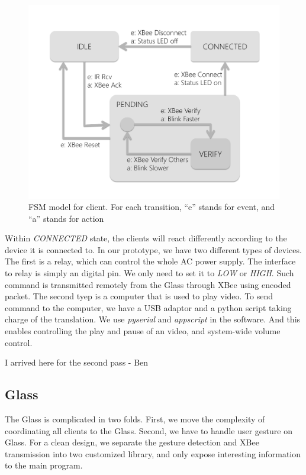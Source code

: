 \begin{figure}
  \centering
  \includegraphics[width=\linewidth]{../figs/clientFSM.pdf}
  \caption{FSM model for client. For each transition, ``e'' stands for event, and ``a'' stands for action}
  \label{fig:clientFSM}
\end{figure}

Within {\it CONNECTED} state, the clients will react differently according to the device it is connected to. In our prototype, we have two different types of devices. The first is a relay, which can control the whole AC power supply. The interface to relay is simply an digital pin. We only need to set it to {\it LOW} or {\it HIGH}. Such command is transmitted remotely from the Glass through XBee using encoded packet. The second tyep is a computer that is used to play video. To send command to the computer, we have a USB adaptor and a python script taking charge of the translation. We use {\it pyserial} and {\it appscript} in the software. And this enables controlling the play and pause of an video, and system-wide volume control.

{\color{red} I arrived here for the second pass - Ben}

\subsection{Glass}
\label{sec:glass}

The Glass is complicated in two folds. First, we move the complexity of coordinating all clients to the Glass. Second, we have to handle user gesture on Glass. For a clean design, we separate the gesture detection and XBee transmission into two customized library, and only expose interesting information to the main program.

